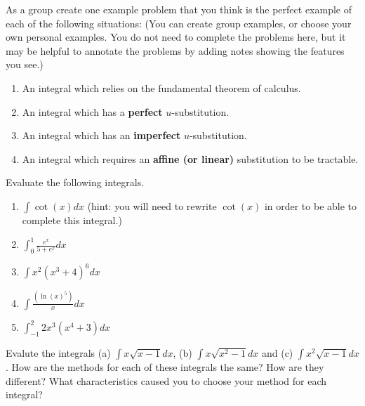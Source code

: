 \documentclass{ximera}
\begin{document}
\begin{exercise}
    As a group create one example problem that you think is the perfect example of each of the following situations: (You can create group examples, or choose your own personal examples. You do not need to complete the problems here, but it may be helpful to annotate the problems by adding notes showing the features you see.)
        \begin{enumerate}
            \item An integral which relies on the fundamental theorem of calculus.
            
            \item An integral which has a \textbf{perfect} $u$-substitution.
            
            \item An integral which has an \textbf{imperfect} $u$-substitution.
            
            \item An integral which requires an \textbf{affine (or linear)} substitution to be tractable.
        \end{enumerate}
\end{exercise}

\begin{exercise}
    Evaluate the following integrals.
    \begin{enumerate}
        \item $\int \cot(x)dx $ (hint: you will need to rewrite $\cot(x)$ in order to be able to complete this integral.)
        \item $\int_0^1 \frac{e^x}{5+e^x}dx$
        \item $\int x^2(x^3+4)^6dx$
        \item $\int \frac{(\ln(x)^5)}{x}dx$
        \item $\int_{-1}^2 2x^3(x^4+3)dx$
    \end{enumerate}
\end{exercise}

\begin{exercise}
    Evalute the integrals (a) $\int x\sqrt{x-1}dx$, (b) $\int x\sqrt{x^2-1}dx$ and (c) $\int x^2\sqrt{x-1}dx$.  How are the methods for each of these integrals the same?  How are they different?  What characteristics caused you to choose your method for each integral?
\end{exercise}
\end{document}
